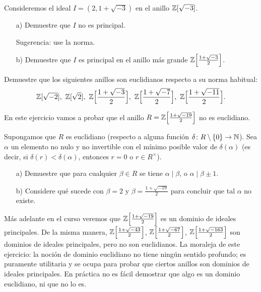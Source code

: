 \begin{ejercicio}
  Consideremos el ideal $I = (2, 1 + \sqrt{-3})$ en el anillo $\mathbb{Z} [\sqrt{-3}]$.

  \begin{enumerate}
  \item[a)] Demuestre que $I$ no es principal.

    Sugerencia: use la norma.

  \item[b)] Demuestre que $I$ es principal en el anillo más grande
    $\mathbb{Z} \Bigl[\frac{1+\sqrt{-3}}{2}\Bigr]$.
  \end{enumerate}
\end{ejercicio}

\begin{ejercicio}
  Demuestre que los siguientes anillos son euclidianos respecto a su norma
  habitual:
  \[ \mathbb{Z} [\sqrt{-2}], ~ \mathbb{Z} [\sqrt{2}], ~
     \mathbb{Z} \Bigl[\frac{1+\sqrt{-3}}{2}\Bigr], ~
     \mathbb{Z} \Bigl[\frac{1+\sqrt{-7}}{2}\Bigr], ~
     \mathbb{Z} \Bigl[\frac{1+\sqrt{-11}}{2}\Bigr]. \]
\end{ejercicio}

\begin{ejercicio}
  En este ejercicio vamos a probar que el anillo
  $R = \mathbb{Z} \Bigl[\frac{1+\sqrt{-19}}{2}\Bigr]$ no es euclidiano.

  Supongamos que $R$ es euclidiano (respecto a alguna función
  $\delta\colon R\setminus \{0\} \to \mathbb{N}$). Sea $\alpha$ un elemento no nulo
  y no invertible con el mínimo posible valor de $\delta (\alpha)$
  (es decir, si $\delta (r) < \delta (\alpha)$, entonces $r = 0$ o
  $r \in R^\times$).

  \begin{enumerate}
  \item[a)] Demuestre que para cualquier $\beta \in R$ se tiene
    $\alpha \mid \beta$, o $\alpha \mid \beta \pm 1$.

  \item[b)] Considere qué sucede con $\beta = 2$ y
    $\beta = \frac{1+\sqrt{-19}}{2}$ para concluir que tal $\alpha$ no existe.
  \end{enumerate}

  Más adelante en el curso veremos que $\mathbb{Z} \Bigl[\frac{1+\sqrt{-19}}{2}\Bigr]$
  es un dominio de ideales principales. De la misma manera,
  $\mathbb{Z} \Bigl[\frac{1+\sqrt{-43}}{2}\Bigr]$,
  $\mathbb{Z} \Bigl[\frac{1+\sqrt{-67}}{2}\Bigr]$,
  $\mathbb{Z} \Bigl[\frac{1+\sqrt{-163}}{2}\Bigr]$
  son dominios de ideales principales, pero no son euclidianos. La moraleja de
  este ejercicio: la noción de dominio euclidiano no tiene ningún sentido
  profundo; es puramente utilitaria y se ocupa para probar que ciertos anillos
  son dominios de ideales principales. En práctica no es fácil demostrar que
  algo es un dominio euclidiano, ni que no lo es.
\end{ejercicio}

